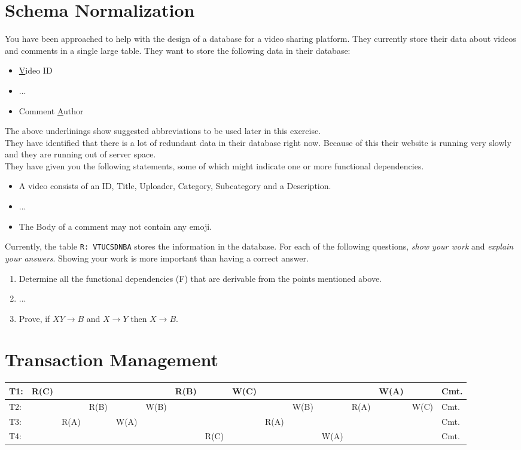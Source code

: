\documentclass{article}
\begin{document}
\section{Schema Normalization}
You have been approached to help with the design of a database for a video sharing platform. They currently store their data about videos and comments in a single large table. They want to store the following data in their database:
\begin{itemize}
	\item \underline{V}ideo ID
	\item ...
	\item Comment \underline{A}uthor
\end{itemize}
The above underlinings show suggested abbreviations to be used later in this exercise.\\

They have identified that there is a lot of redundant data in their database right now. Because of this their website is running very slowly and they are running out of server space.\\

They have given you the following statements, some of which might indicate one or more functional dependencies.
\begin{itemize}
	\item A video consists of an ID, Title, Uploader, Category, Subcategory and a Description.
	\item ...
	\item The Body of a comment may not contain any emoji.
\end{itemize}
Currently, the table \texttt{R: VTUCSDNBA} stores the information in the database. For each of the following questions, \emph{show your work} and \emph{explain your answers}. Showing your work is more important than having a correct answer.
\begin{enumerate}
	\item Determine all the functional dependencies (F) that are derivable from the points mentioned above.
	\item ...
	\item Prove, if $XY\rightarrow B$ and $X \rightarrow Y$ then $X \rightarrow B$.
\end{enumerate}

\section{Transaction Management}
{\small %
\begin{tabular}{|l||lllllllllllllll|}
\hline
T1:&R(C)& & & & &R(B)& &W(C)& & & & &W(A)&&Cmt.\\ \hline
T2:&& &R(B)& &W(B)& & & & &W(B)& &R(A)& &W(C)&Cmt.\\ \hline
T3:&&R(A)& &W(A) & & & & &R(A)& & & & &&Cmt.\\ \hline
T4:&& & & & & &R(C) & & & &W(A)& & &&Cmt.\\ \hline
\end{tabular}
}
\end{document}
